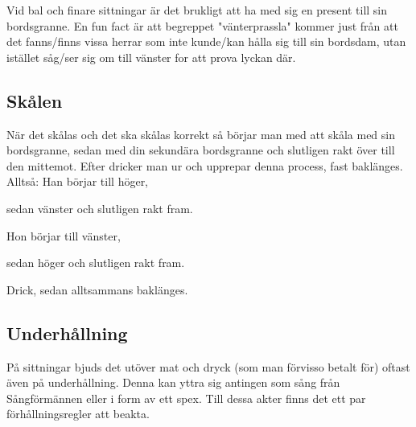 Vid bal och finare sittningar är det brukligt att ha med sig en present till sin bordsgranne. 
En fun fact är att begreppet "vänterprassla" kommer just från att det fanns/finns vissa herrar som inte kunde/kan hålla sig till sin bordsdam, 
utan istället såg/ser sig om till vänster for att prova lyckan där.



\newpage

\subsection*{Skålen}

När det skålas och det ska skålas korrekt så börjar man 
med att skåla med sin bordsgranne, sedan med din sekundära 
bordsgranne och slutligen rakt över till den mittemot. 
Efter dricker man ur och upprepar denna process, fast baklänges.
\\

Alltså:
Han börjar till höger,

sedan vänster och slutligen rakt fram.

Hon börjar till vänster,

sedan höger och slutligen rakt fram.

Drick, sedan alltsammans baklänges.


\newpage

\subsection*{Underhållning}
På sittningar bjuds det utöver mat och dryck (som man förvisso betalt för) oftast även på underhållning.
Denna kan yttra sig antingen som sång från Sångförmännen eller i form av ett spex.
Till dessa akter finns det ett par förhållningsregler att beakta.
\\

